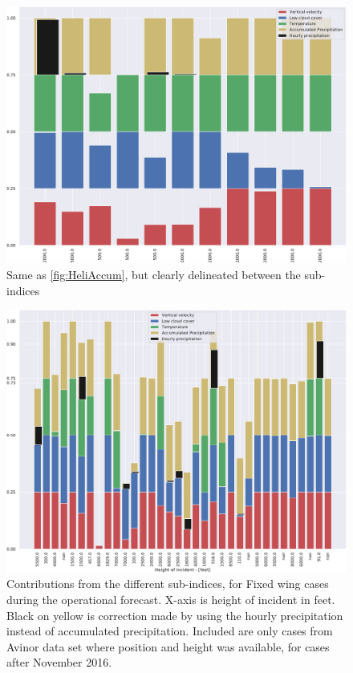 \begin{figure}[H]
    \centering
    \includegraphics[width=\textwidth]{Figures/HeliDecomp.pdf}
    \caption{Same as \ref{fig:HeliAccum}, but clearly delineated between the sub-indices}
    \label{fig:HeliDecomp}
\end{figure}

\begin{figure}[H]
    \centering
    \includegraphics[width=\textwidth]{Figures/FWAccum.pdf}
    \caption{Contributions from the different sub-indices, for Fixed wing cases during the operational forecast. X-axis is height of incident in feet. Black on yellow is correction made by using the hourly precipitation instead of accumulated precipitation. Included are only cases from Avinor data set where position and height was available, for cases after November 2016.}
    \label{fig:FWAccum}
\end{figure}

